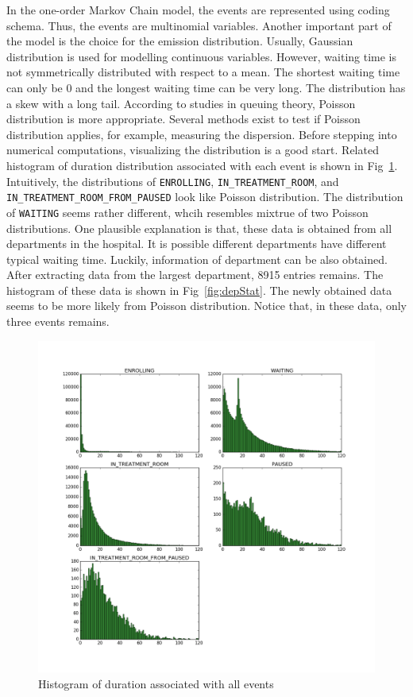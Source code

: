 In the one-order Markov Chain model, the events are represented using  coding schema. Thus, the events are multinomial variables. Another important part of the model is the choice for the emission distribution. Usually, Gaussian distribution is used for modelling continuous variables. However, waiting time is not symmetrically distributed with respect to a mean. The shortest waiting time can only be 0 and the longest waiting time can be very long. The distribution has a skew with a long tail. According to studies in queuing theory, Poisson distribution is more appropriate. Several methods exist to test if Poisson distribution applies, for example, measuring the dispersion. Before stepping into numerical computations, visualizing the distribution is a good start. Related histogram of duration distribution associated with each event is shown in Fig~\ref{fig:fullStat}. Intuitively, the distributions of \texttt{ENROLLING},  \texttt{IN\_TREATMENT\_ROOM}, and \texttt{IN\_TREATMENT\_ROOM\_FROM\_PAUSED} look like Poisson distribution. The distribution of \texttt{WAITING} seems rather different, whcih resembles mixtrue of two Poisson distributions. One plausible explanation is that, these data is obtained from all departments in the hospital. It is possible different departments have different typical waiting time. Luckily, information of department can be also obtained. After extracting data from the largest department, 8915 entries remains. The histogram of these data is shown in Fig~\ref{fig:depStat}. The newly obtained data seems to be more likely from Poisson distribution. Notice that, in these data, only three events remains.


\begin{figure}[!ht]
	\begin{center}
		\includegraphics[width=\textwidth]{images/fullStat}
		\caption{Histogram of duration associated with all events}
		\label{fig:fullStat}
	\end{center}
\end{figure}


